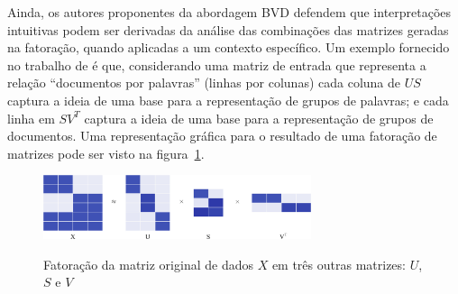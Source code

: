 \documentclass[
    12pt,                %
    oneside,            %
    a4paper,            %
    english,            %
    brazil                %
    ]{abntex2ppgsi}
\begin{document}

Ainda, os autores proponentes da abordagem BVD defendem que interpretações intuitivas podem ser derivadas da análise das combinações das matrizes geradas na fatoração, quando aplicadas a um contexto específico. Um exemplo fornecido no trabalho de  é que, considerando uma matriz de entrada que representa a relação ``documentos por palavras'' (linhas por colunas) cada coluna de $US$ captura a ideia de uma base para a representação de grupos de palavras; e cada linha em $SV^T$ captura a ideia de uma base para a representação de grupos de documentos. Uma representação gráfica para o resultado de uma fatoração de matrizes pode ser visto na figura~\ref{fig:bvd}.



\begin{figure}[H]
\centering
    \caption{
        Fatoração da matriz original de dados $X$ em três outras matrizes: $U$, $S$ e $V$}
    \includegraphics[width=0.7\textwidth]{img/factorizationXUSV.png}
    \label{fig:bvd}
\end{figure}
\end{document}
